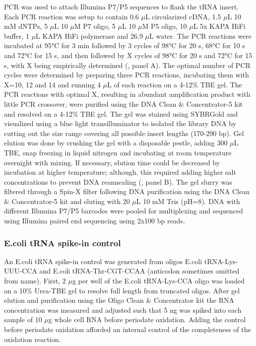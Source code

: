 \documentclass[9pt,lineno]{elife}
\begin{document}
PCR was used to attach Illumina P7/P5 sequences to flank the tRNA insert.
Each PCR reaction was setup to contain 0.6 $\mu$L circularized cDNA, 1.5 $\mu$L 10 mM dNTPs, 5 $\mu$L 10 $\mu$M P7 oligo, 5 $\mu$L 10 $\mu$M P5 oligo, 10 $\mu$L 5x KAPA HiFi buffer, 1 $\mu$L KAPA HiFi polymerase and 26.9 $\mu$L water.
The PCR reactions were incubated at 95°C for 3 min followed by 3 cycles of 98°C for 20 s, 68°C for 10 s and 72°C for 15 s, and then followed by X cycles of 98°C for 20 s and 72°C for 15 s, with X being empirically determined (, panel A).
The optimal number of PCR cycles were determined by preparing three PCR reactions, incubating them with X=10, 12 and 14 and running 4 $\mu$L of each reaction on a 4-12\% TBE gel.
The PCR reactions with optimal X, resulting in abundant amplification product with little PCR crossover, were purified using the DNA Clean \& Concentrator-5 kit and resolved on a 4-12\% TBE gel.
The gel was stained using SYBRGold and visualized using a blue light transilluminator to isolated the library DNA by cutting out the size range covering all possible insert lengths (170-290 bp).
Gel elution was done by crushing the gel with a disposable pestle, adding 300 $\mu$L TBE, snap freezing in liquid nitrogen and incubating at room temperature overnight with mixing.
If necessary, elution time could be decreased by incubation at higher temperature; although, this required adding higher salt concentrations to prevent DNA reannealing (, panel B).
The gel slurry was filtered through a Spin-X filter following DNA purification using the DNA Clean \& Concentrator-5 kit and eluting with 20 $\mu$L 10 mM Tris (pH=8).
DNA with different Illumina P7/P5 barcodes were pooled for multiplexing and sequenced using Illumina paired end sequencing using 2x100 bp reads.



\subsubsection{E.coli tRNA spike-in control}
An E.coli tRNA spike-in control was generated from oligos E.coli tRNA-Lys-UUU-CCA and E.coli tRNA-Thr-CGT-CCAA (anticodon sometimes omitted from name).
First, 2 $\mu$g per well of the E.coli tRNA-Lys-CCA oligo was loaded on a 10\% Urea-TBE gel to resolve full length from truncated oligos.
After gel elution and purification using the Oligo Clean \& Concentrator kit the RNA concentration was measured and adjusted such that 5 ng was spiked into each sample of 10 $\mu$g whole cell RNA before periodate oxidation.
Adding the control before periodate oxidation afforded an internal control of the completeness of the oxidation reaction.
\end{document}
